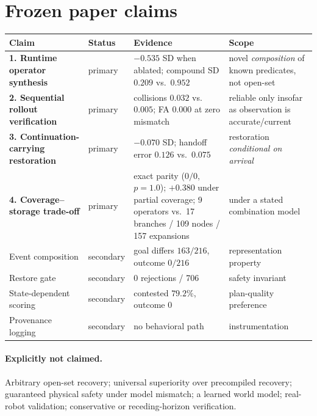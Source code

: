 \documentclass[11pt]{article}
\begin{document}
\section{Frozen paper claims}

\begin{center}
\begin{longtable}{p{}p{}p{}p{}}
\toprule
Claim & Status & Evidence & Scope \\
\midrule
\endhead
\textbf{1. Runtime operator synthesis} & primary &
  $-0.535$ SD when ablated; compound SD $0.209$ vs.\ $0.952$ &
  novel \emph{composition} of known predicates, not open-set \\
\textbf{2. Sequential rollout verification} & primary &
  collisions $0.032$ vs.\ $0.005$; FA $0.000$ at zero mismatch &
  reliable only insofar as observation is accurate/current \\
\textbf{3. Continuation-carrying restoration} & primary &
  $-0.070$ SD; handoff error $0.126$ vs.\ $0.075$ &
  restoration \emph{conditional on arrival} \\
\textbf{4. Coverage--storage trade-off} & primary &
  exact parity ($0/0$, $p=1.0$); $+0.380$ under partial coverage;
  9 operators vs.\ 17 branches / 109 nodes / 157 expansions &
  under a stated combination model \\
\midrule
Event composition & secondary & goal differs $163/216$, outcome $0/216$ &
  representation property \\
Restore gate & secondary & 0 rejections / 706 & safety invariant \\
State-dependent scoring & secondary & contested $79.2\%$, outcome $0$ &
  plan-quality preference \\
Provenance logging & secondary & no behavioral path & instrumentation \\
\bottomrule
\end{longtable}
\end{center}

\paragraph{Explicitly not claimed.}
Arbitrary open-set recovery; universal superiority over precompiled recovery;
guaranteed physical safety under model mismatch; a learned world model;
real-robot validation; conservative or receding-horizon verification.
\end{document}
